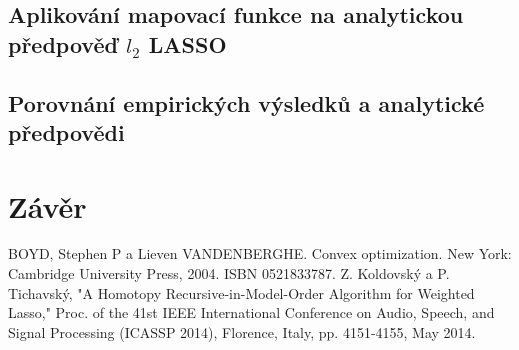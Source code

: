 \documentclass[FM,BP]{tulthesis}
\begin{document}
\section{Aplikování mapovací funkce na analytickou předpověď  $l_{2}$ LASSO}

\section{Porovnání empirických výsledků a analytické předpovědi}
\chapter{Závěr}
\label{ch:end}

\renewcommand{\bibname}{Seznam použité literatury}
\begin{thebibliography}{99}
 BOYD, Stephen P a Lieven VANDENBERGHE. Convex optimization. New York: Cambridge University Press, 2004. ISBN 0521833787.
Z. Koldovský a P. Tichavský, "A Homotopy Recursive-in-Model-Order Algorithm for Weighted Lasso," Proc. of the 41st IEEE International Conference on Audio, Speech, and Signal Processing (ICASSP 2014), Florence, Italy, pp. 4151-4155, May 2014.
\end{thebibliography}
\clearpage
\appendix
\end{document}
